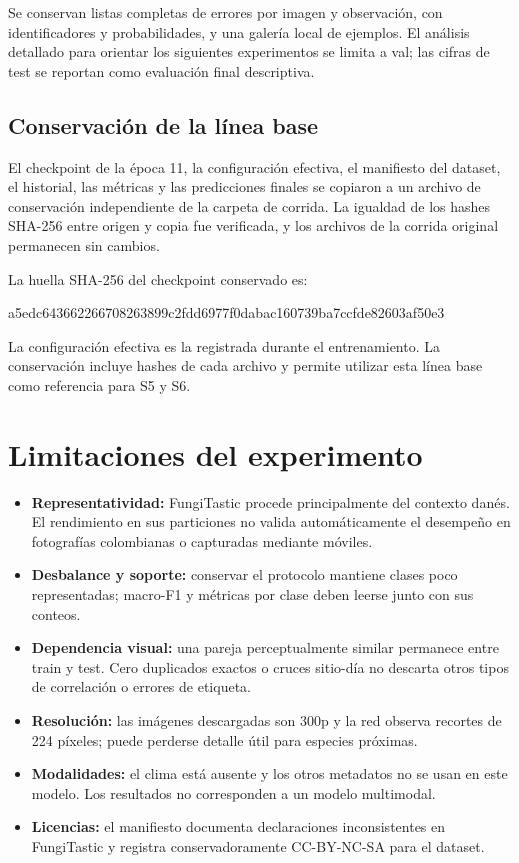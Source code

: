 \documentclass[11pt,a4paper]{article}
\begin{document}
Se conservan listas completas de errores por imagen y observación, con
identificadores y probabilidades, y una galería local de ejemplos. El
análisis detallado para orientar los siguientes experimentos se limita
a val; las cifras de test se reportan como evaluación final descriptiva.

\subsection{Conservación de la línea base}

El checkpoint de la época 11, la configuración efectiva, el manifiesto
del dataset, el historial, las métricas y las predicciones finales se
copiaron a un archivo de conservación independiente de la carpeta de corrida.
La igualdad de los hashes SHA-256 entre origen y copia fue verificada,
y los archivos de la corrida original permanecen sin cambios.

La huella SHA-256 del checkpoint conservado es:
\begin{center}\small\ttfamily
a5edc643662266708263899c2fdd6977f0dabac160739ba7ccfde82603af50e3
\end{center}

La configuración efectiva es la registrada durante el entrenamiento.
La conservación incluye hashes de cada archivo y permite utilizar esta
línea base como referencia para S5 y S6.
\section{Limitaciones del experimento}

\begin{itemize}
\item \textbf{Representatividad:} FungiTastic procede principalmente del contexto
danés. El rendimiento en sus particiones no valida automáticamente el desempeño
en fotografías colombianas o capturadas mediante móviles.
\item \textbf{Desbalance y soporte:} conservar el protocolo mantiene clases poco
representadas; macro-F1 y métricas por clase deben leerse junto con sus conteos.
\item \textbf{Dependencia visual:} una pareja perceptualmente similar permanece
entre train y test. Cero duplicados exactos o cruces sitio-día no descarta otros
tipos de correlación o errores de etiqueta.
\item \textbf{Resolución:} las imágenes descargadas son 300p y la red observa
recortes de 224 píxeles; puede perderse detalle útil para especies próximas.
\item \textbf{Modalidades:} el clima está ausente y los otros metadatos no se
usan en este modelo. Los resultados no corresponden a un modelo multimodal.
\item \textbf{Licencias:} el manifiesto documenta declaraciones inconsistentes
en FungiTastic y registra conservadoramente CC-BY-NC-SA para el dataset.
\end{itemize}
\end{document}
